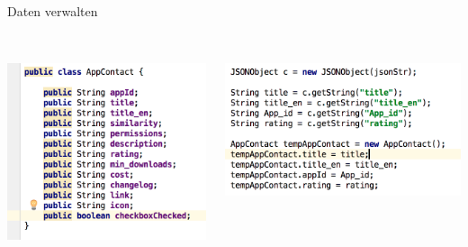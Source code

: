 \documentclass[compress,t]{beamer}
\begin{document}
\begin{frame}[fragile]{Daten verwalten}

    \begin{columns}
        \begin{column}{0.50\textwidth}\\
              \includegraphics[width=1.0\textwidth]{img/Daten_klass.png}
        \end{column}
        \begin{column}{0.50\textwidth}\\
            \includegraphics[width=1.0\textwidth]{img/Daten_speichern.png}
        \end{column}
    \end{columns}

\end{frame}
\end{document}
